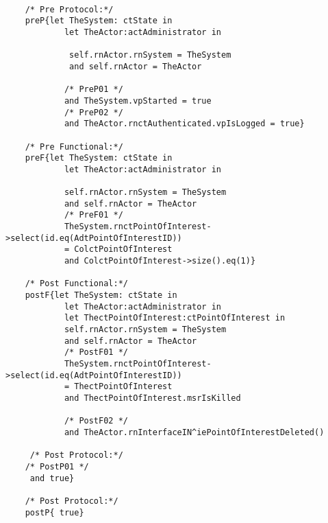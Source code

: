 	\scriptsize
	\vspace{0.5cm}
	\begin{lstlisting}[style=MessirStyle,firstnumber=auto,captionpos=b,caption={\msrmessir (MCL-oriented) specification of the operation \emph{oeDeletePointOfInterest}.},label=OM-actAdministrator-oeDeletePointOfInterest-MCL-LST]

	/* Pre Protocol:*/ 
	preP{let TheSystem: ctState in
	  		let TheActor:actAdministrator in
	  
	 		 self.rnActor.rnSystem = TheSystem
	 		 and self.rnActor = TheActor
	  
			/* PreP01 */
	  		and TheSystem.vpStarted = true
			/* PreP02 */
	  		and TheActor.rnctAuthenticated.vpIsLogged = true}
	
	/* Pre Functional:*/
	preF{let TheSystem: ctState in
	  		let TheActor:actAdministrator in
	   
	  		self.rnActor.rnSystem = TheSystem
	  		and self.rnActor = TheActor
			/* PreF01 */
	  		TheSystem.rnctPointOfInterest->select(id.eq(AdtPointOfInterestID))
	  		= ColctPointOfInterest
	  		and ColctPointOfInterest->size().eq(1)}
	
	/* Post Functional:*/ 
	postF{let TheSystem: ctState in
	  		let TheActor:actAdministrator in
	  		let ThectPointOfInterest:ctPointOfInterest in
	  		self.rnActor.rnSystem = TheSystem
	  		and self.rnActor = TheActor
			/* PostF01 */
	  		TheSystem.rnctPointOfInterest->select(id.eq(AdtPointOfInterestID))
	 		= ThectPointOfInterest
	  		and ThectPointOfInterest.msrIsKilled
	 
	 		/* PostF02 */
	  		and TheActor.rnInterfaceIN^iePointOfInterestDeleted()
	
	 /* Post Protocol:*/
	/* PostP01 */
	 and true}
	
	/* Post Protocol:*/ 
	postP{ true}
	
	\end{lstlisting}
	\normalsize 
	
	
	
	





